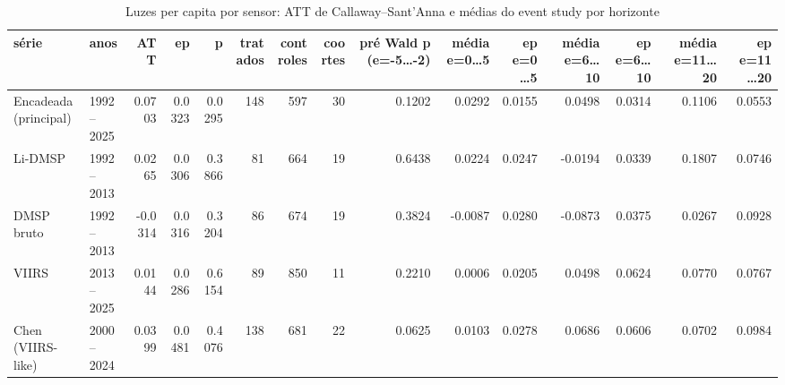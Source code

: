 \begin{table}
\caption{Luzes per capita por sensor: ATT de Callaway–Sant'Anna e médias do event study por horizonte}
\label{tab:s08_luzes_sensor}
\begin{tabular}{llrrrrrrrrrrrrr}
\toprule
série & anos & ATT & ep & p & tratados & controles & coortes & pré Wald p (e=-5…-2) & média e=0…5 & ep e=0…5 & média e=6…10 & ep e=6…10 & média e=11…20 & ep e=11…20 \\
\midrule
Encadeada (principal) & 1992–2025 & 0.0703 & 0.0323 & 0.0295 & 148 & 597 & 30 & 0.1202 & 0.0292 & 0.0155 & 0.0498 & 0.0314 & 0.1106 & 0.0553 \\
Li-DMSP & 1992–2013 & 0.0265 & 0.0306 & 0.3866 & 81 & 664 & 19 & 0.6438 & 0.0224 & 0.0247 & -0.0194 & 0.0339 & 0.1807 & 0.0746 \\
DMSP bruto & 1992–2013 & -0.0314 & 0.0316 & 0.3204 & 86 & 674 & 19 & 0.3824 & -0.0087 & 0.0280 & -0.0873 & 0.0375 & 0.0267 & 0.0928 \\
VIIRS & 2013–2025 & 0.0144 & 0.0286 & 0.6154 & 89 & 850 & 11 & 0.2210 & 0.0006 & 0.0205 & 0.0498 & 0.0624 & 0.0770 & 0.0767 \\
Chen (VIIRS-like) & 2000–2024 & 0.0399 & 0.0481 & 0.4076 & 138 & 681 & 22 & 0.0625 & 0.0103 & 0.0278 & 0.0686 & 0.0606 & 0.0702 & 0.0984 \\
\bottomrule
\end{tabular}
\end{table}
